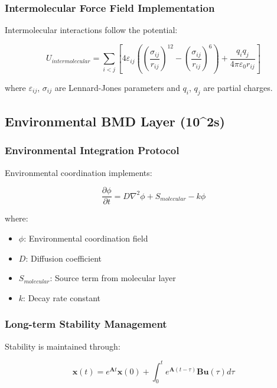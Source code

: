 \subsubsection{Intermolecular Force Field Implementation}

Intermolecular interactions follow the potential:

\begin{equation}
U_{intermolecular} = \sum_{i<j} \left[ 4\varepsilon_{ij} \left( \left(\frac{\sigma_{ij}}{r_{ij}}\right)^{12} - \left(\frac{\sigma_{ij}}{r_{ij}}\right)^6 \right) + \frac{q_i q_j}{4\pi\varepsilon_0 r_{ij}} \right]
\end{equation}

where $\varepsilon_{ij}$, $\sigma_{ij}$ are Lennard-Jones parameters and $q_i$, $q_j$ are partial charges.

\subsection{Environmental BMD Layer (10^2s)}

\subsubsection{Environmental Integration Protocol}

Environmental coordination implements:

\begin{equation}
\frac{\partial \phi}{\partial t} = D \nabla^2 \phi + S_{molecular} - k \phi
\end{equation}

where:
\begin{itemize}
\item $\phi$: Environmental coordination field
\item $D$: Diffusion coefficient  
\item $S_{molecular}$: Source term from molecular layer
\item $k$: Decay rate constant
\end{itemize}

\subsubsection{Long-term Stability Management}

Stability is maintained through:

\begin{equation}
\mathbf{x}(t) = e^{\mathbf{A}t} \mathbf{x}(0) + \int_0^t e^{\mathbf{A}(t-\tau)} \mathbf{B} \mathbf{u}(\tau) d\tau
\end{equation}

